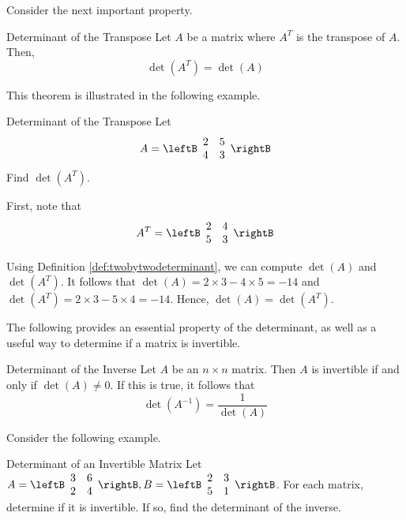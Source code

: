 Consider the next important property. 

\begin{theorem}{Determinant of the Transpose}\label{thm:transposedeterminant}
Let $A$ be a matrix where $A^T$ is the transpose of $A$. Then,
\begin{equation*}
\det\left(A^T\right) = \det \left( A \right)
\end{equation*}
\end{theorem}

This theorem is illustrated in the following example. 

\begin{example}{Determinant of the Transpose}\label{exa:transposedeterminant}
Let
\begin{equation*}
A
=
\leftB
\begin{array}{rr}
2 & 5 \\
4 & 3
\end{array}
\rightB
\end{equation*}
Find $\det \left(A^T\right)$.
\end{example}

\begin{solution}
First, note that 
\begin{equation*}
A^{T}
=
\leftB
\begin{array}{rr}
2 & 4 \\
5 & 3
\end{array}
\rightB
\end{equation*}

Using Definition \ref{def:twobytwodeterminant}, we can compute $\det \left(A\right)$ and $\det \left(A^T\right)$. It follows that
$\det \left(A\right) = 2 \times 3 - 4 \times 5 = -14$ and $\det \left(A^T\right) = 2 \times 3 - 5 \times 4 = -14$. 
Hence, $\det \left(A\right) = \det \left(A^T\right)$.
\end{solution}

The following provides an essential property of the determinant, as well as a useful way to determine if a matrix is invertible.

\begin{theorem}{Determinant of the Inverse}\label{thm:detinverse}
Let $A$ be an $n \times n$ matrix. Then $A$ is invertible if and only if $\det(A) \neq 0$. If this is true, it follows that 
\[
\det(A^{-1}) = \frac{1}{\det(A)}
\]
\end{theorem}

Consider the following example.

\begin{example}{Determinant of an Invertible Matrix}\label{exa:detinvertiblematrix}
Let $A = \leftB \begin{array}{rr}
3 & 6 \\
2 & 4 
\end{array} \rightB, B = \leftB \begin{array}{rr}
2 & 3 \\
5 & 1
\end{array} \rightB$. For each matrix, determine if it is invertible. If so, find the determinant of the inverse. 
\end{example}


